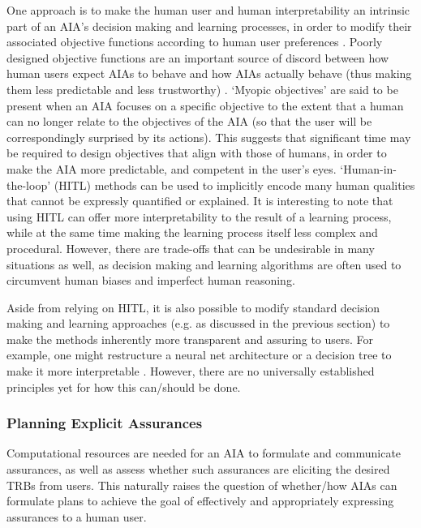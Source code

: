     One approach is to make the human user and human interpretability an intrinsic part of an AIA's decision making and learning processes, in order to modify their associated objective functions according to human user preferences \cite{Freitas2006-qo,Dragan2013-wd}.  
    Poorly designed objective functions are an important source of discord between how human users expect AIAs to behave and how AIAs actually behave (thus making them less predictable and less trustworthy) \cite{Amodei2016-xi}. 
    `Myopic objectives' are said to be present when an AIA focuses on a specific objective to the extent that a human can no longer relate to the objectives of the AIA (so that the user will be correspondingly surprised by its actions). This suggests that significant time may be required to design objectives that align with those of humans, in order to make the AIA more predictable, and competent in the user's eyes. 
    `Human-in-the-loop' (HITL) methods can be used to implicitly encode many human qualities that cannot be expressly quantified or explained. 
    It is interesting to note that using HITL can offer more interpretability to the result of a learning process, while at the same time making the learning process itself less complex and procedural. 
    However, there are trade-offs that can be undesirable in many situations as well, as decision making and learning algorithms are often used to circumvent human biases and imperfect human reasoning. 

    Aside from relying on HITL, it is also possible to modify standard decision making and learning approaches (e.g. as discussed in the previous section) to make the methods inherently more transparent and assuring to users. For example, one might restructure a neural net architecture or a decision tree to make it more interpretable \cite{Choi2016-by,Abdollahi2016-vn,Jovanovic2016-gw}. However, there are no universally established principles yet for how this can/should be done.

\subsubsection{Planning Explicit Assurances}
    Computational resources are needed for an AIA to formulate and communicate assurances, as well as assess whether such assurances are eliciting the desired TRBs from users. This naturally raises the question of whether/how AIAs can formulate plans to achieve the goal of effectively and appropriately expressing assurances to a human user. 

